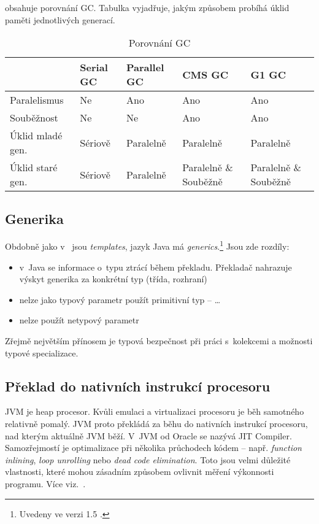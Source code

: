  obsahuje porovnání GC. Tabulka vyjadřuje, jakým způsobem probíhá úklid paměti jednotlivých generací.

\begin{table}
\center
\begin{tabular}{|l || l | l | p{2cm} | p{2cm} |}
\hline
& Serial GC & Parallel GC & CMS GC & G1 GC \\ \hline \hline
Paralelismus & Ne & Ano & Ano & Ano \\ \hline
Souběžnost & Ne & Ne & Ano & Ano \\ \hline
Úklid mladé gen. & Sériově & Paralelně & Paralelně & Paralelně \\ \hline
Úklid staré gen. & Sériově & Paralelně & Paralelně \& \mbox{Souběžně} & Paralelně \& \mbox{Souběžně} \\
 \hline
\end{tabular}
\caption{Porovnání GC}
\label{tab:gcs}
\end{table}

\subsection{Generika\label{sub:generika}}

Obdobně jako v~\CC{} jsou \emph{templates}\cite{ISO:2012:CPP}, jazyk Java má \emph{generics}.\footnote{Uvedeny ve verzi 1.5 \cite{gosling2013java}.}
Jsou zde rozdíly:
\begin{itemize}
  \item v~Java se informace o~typu ztrácí během překladu. Překladač nahrazuje výskyt generika za konkrétní typ (třída, rozhraní)
  \item nelze jako typový parametr použít primitivní typ --  \ldots{}
  \item nelze použít netypový parametr
\end{itemize}

Zřejmě největším přínosem je typová bezpečnost při práci s~kolekcemi a možnosti typové specializace.

\subsection{Překlad \bytecode{} do nativních instrukcí procesoru}

JVM je heap procesor. Kvůli emulaci a virtualizaci procesoru je
běh samotného \bytecode{} relativně pomalý. JVM proto překládá
za běhu \bytecode{} do nativních instrukcí procesoru, nad kterým
aktuálně JVM běží. V~JVM od Oracle
 se nazývá JIT Compiler\cite{hunt2011java}. Samozřejmostí je optimalizace při několika průchodech
kódem -- např. \emph{function inlining}, \emph{loop unrolling} nebo \emph{dead code elimination}\cite{hunt2011java}. Toto jsou velmi důležité vlastnosti, které mohou zásadním způsobem
ovlivnit měření výkonnosti programu. Více viz.~.

